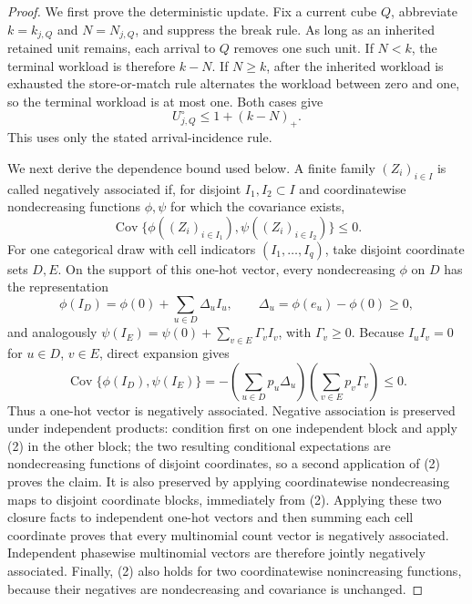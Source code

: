 \documentclass{article}
\begin{document}
\begin{proof}
We first prove the deterministic update.  Fix a current cube \(Q\), abbreviate \(k=k_{j,Q}\) and \(N=N_{j,Q}\), and suppress the break rule.  As long as an inherited retained unit remains, each arrival to \(Q\) removes one such unit.  If \(N<k\), the terminal workload is therefore \(k-N\).  If \(N\ge k\), after the inherited workload is exhausted the store-or-match rule alternates the workload between zero and one, so the terminal workload is at most one.  Both cases give
\[
 U^\circ_{j,Q}\le 1+(k-N)_+ . \tag{1}
\]
This uses only the stated arrival-incidence rule.

We next derive the dependence bound used below.  A finite family \((Z_i)_{i\in I}\) is called negatively associated if, for disjoint \(I_1,I_2\subset I\) and coordinatewise nondecreasing functions \(\phi,\psi\) for which the covariance exists,
\[
 \operatorname{Cov}\{\phi((Z_i)_{i\in I_1}),\psi((Z_i)_{i\in I_2})\}\le0. \tag{2}
\]
For one categorical draw with cell indicators \((I_1,\ldots,I_q)\), take disjoint coordinate sets \(D,E\).  On the support of this one-hot vector, every nondecreasing \(\phi\) on \(D\) has the representation
\[
 \phi(I_D)=\phi(0)+\sum_{u\in D}\Delta_u I_u,
 \qquad \Delta_u=\phi(e_u)-\phi(0)\ge0,
\]
and analogously \(\psi(I_E)=\psi(0)+\sum_{v\in E}\Gamma_vI_v\), with \(\Gamma_v\ge0\).  Because \(I_uI_v=0\) for \(u\in D\), \(v\in E\), direct expansion gives
\[
 \operatorname{Cov}\{\phi(I_D),\psi(I_E)\}
 =-\left(\sum_{u\in D}p_u\Delta_u\right)
   \left(\sum_{v\in E}p_v\Gamma_v\right)\le0. \tag{3}
\]
Thus a one-hot vector is negatively associated.  Negative association is preserved under independent products: condition first on one independent block and apply (2) in the other block; the two resulting conditional expectations are nondecreasing functions of disjoint coordinates, so a second application of (2) proves the claim.  It is also preserved by applying coordinatewise nondecreasing maps to disjoint coordinate blocks, immediately from (2).  Applying these two closure facts to independent one-hot vectors and then summing each cell coordinate proves that every multinomial count vector is negatively associated.  Independent phasewise multinomial vectors are therefore jointly negatively associated.  Finally, (2) also holds for two coordinatewise nonincreasing functions, because their negatives are nondecreasing and covariance is unchanged.


\end{proof}
\end{document}
